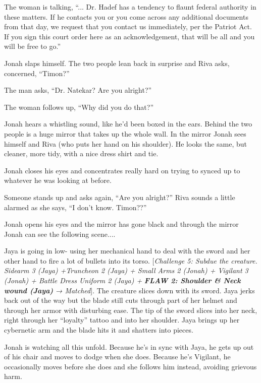 The woman is talking, ``... Dr. Hadef has a tendency to flaunt federal authority in these matters.  If he contacts you or you come across any additional documents from that day, we request that you contact us immediately, per the Patriot Act.  If you sign this court order here as an acknowledgement, that will be all and you will be free to go.''

Jonah slaps himself.  The two people lean back in surprise and Riva asks, concerned, ``Timon?''

The man asks, ``Dr. Natekar?  Are you alright?''

The woman follows up, ``Why did you do that?''

Jonah hears a whistling sound, like he'd been boxed in the ears.  Behind the two people is a huge mirror that takes up the whole wall.  In the mirror Jonah sees himself and Riva (who puts her hand on his shoulder). He looks the same, but cleaner, more tidy, with a nice dress shirt and tie.

Jonah closes his eyes and concentrates really hard on trying to synced up to whatever he was looking at before.

Someone stands up and asks again, ``Are you alright?''  Riva sounds a little alarmed as she says, ``I don't know.  Timon??''

Jonah opens his eyes and the mirror has gone black and through the mirror Jonah can see the following scene....



Jaya is going in low- using her mechanical hand to deal with the sword and her other hand to fire a lot of bullets into its torso.  {[}\textit{Challenge 5: Subdue the creature.  Sidearm 3 (Jaya) +Truncheon 2 (Jaya) + Small Arms 2 (Jonah) + Vigilant 3 (Jonah) + Battle Dress Uniform 2 (Jaya) + }\textit{\textbf{ {\color[RGB]{255,0,0}FLAW 2: Shoulder \& Neck wound (Jaya)} }}\textit{ → Matched}{]}.  The creature slices down with its sword.  Jaya jerks back out of the way but the blade still cuts through part of her helmet and through her armor with disturbing ease.  The tip of the sword slices into her neck, right through her ``loyalty'' tattoo and into her shoulder.  Jaya brings up her cybernetic arm and the blade hits it and shatters into pieces.  



Jonah is watching all this unfold.  Because he's in sync with Jaya, he gets up out of his chair and moves to dodge when she does.  Because he's Vigilant, he occasionally moves before she does and she follows him instead, avoiding grievous harm.

